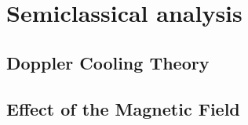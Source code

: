 %
\section{Semiclassical analysis}
%

%
\subsection{Doppler Cooling Theory}
%

%
\subsection{Effect of the Magnetic Field}
%
